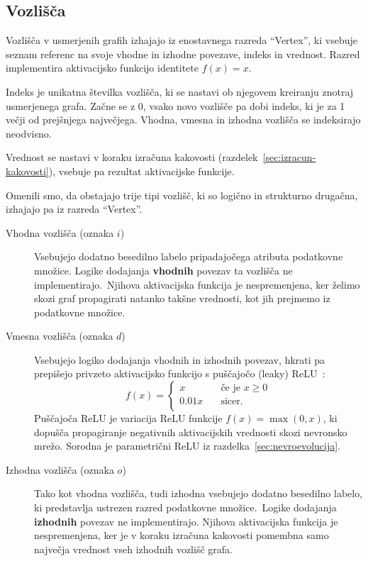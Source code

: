 \documentclass[a4paper,12pt,openright]{book}
\begin{document}
    \subsection{Vozlišča}\label{subsec:vozlisca}
    Vozlišča v usmerjenih grafih izhajajo iz enostavnega razreda \enquote{Vertex}, ki vsebuje seznam referenc
    na svoje vhodne in izhodne povezave, indeks in vrednost.
    Razred implementira aktivacijsko funkcijo identitete $f(x)=x$.

    Indeks je unikatna številka vozlišča, ki se nastavi ob njegovem kreiranju znotraj usmerjenega grafa.
    Začne se z 0, vsako novo vozlišče pa dobi indeks, ki je za 1 večji od prejšnjega največjega.
    Vhodna, vmesna in izhodna vozlišča se indeksirajo neodvisno.

    Vrednost se nastavi v koraku izračuna kakovosti (razdelek~\ref{sec:izracun-kakovosti}), vsebuje pa rezultat aktivacijske funkcije.

    Omenili smo, da obstajajo trije tipi vozlišč, ki so logično in strukturno drugačna, izhajajo
    pa iz razreda \enquote{Vertex}.
    \begin{description}
        \item[Vhodna vozlišča (oznaka $i$)]{Vsebujejo dodatno besedilno labelo pripadajočega atributa podatkovne množice.
        Logike dodajanja \textbf{vhodnih} povezav ta vozlišča ne implementirajo.\ Njihova aktivacijska funkcija je nespremenjena, ker
        želimo skozi graf propagirati natanko takšne vrednosti, kot jih prejmemo iz podatkovne množice. }
        \item[Vmesna vozlišča (oznaka $d$)]{Vsebujejo logiko dodajanja vhodnih in izhodnih povezav, hkrati pa prepišejo
        privzeto aktivacijsko funkcijo s puščajočo (leaky) ReLU~\cite{maas2013rectifier}:
        \begin{equation}
            f(x)=
            \begin{cases}
                x & \quad\text{če je } x\ge0\\
                0.01x & \quad\text{sicer}.\\
            \end{cases}
            \label{eq:leaky_relu}
        \end{equation}
        Puščajoča ReLU je variacija ReLU funkcije $f(x)=\max(0,x)$, ki do\-pušča propagiranje negativnih aktivacijskih
        vrednosti skozi nevronsko mrežo. Sorodna je parametrični ReLU iz razdelka~\ref{sec:nevroevolucija}.}
        \item[Izhodna vozlišča (oznaka $o$)]{Tako kot vhodna vozlišča, tudi izhodna vsebujejo dodatno besedilno labelo, ki predstavlja
        ustrezen razred podatkovne mno\-ži\-ce.\ Logike dodajanja \textbf{izhodnih} povezav ne implementirajo.
        Njihova aktivacijska funkcija je nespremenjena, ker je v koraku izračuna kakovosti pomembna samo največja
        vrednost vseh izhodnih vozlišč grafa. }
    \end{description}
\end{document}
